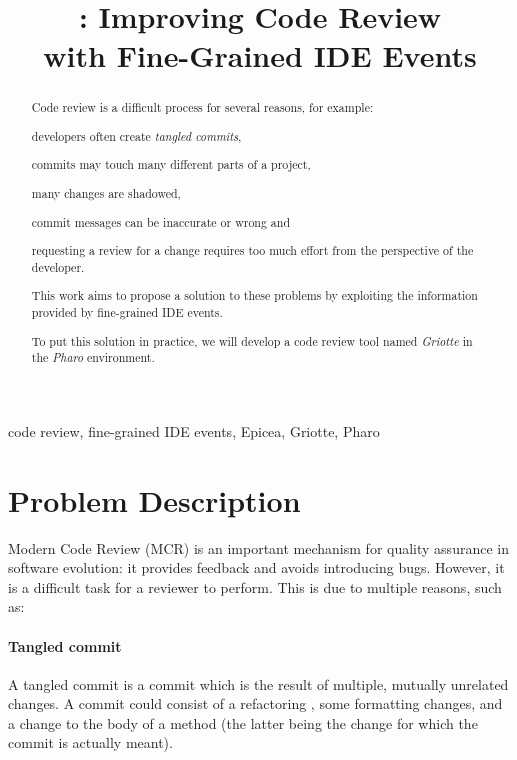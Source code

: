 \documentclass[conference,a4paper]{IEEEtran}
\title{\Gr{}: Improving Code Review\\with Fine-Grained IDE Events}
\author{\IEEEauthorblockN{Skip~Lentz}\IEEEauthorblockA{EEMCS\\Delft
    University of Technology} \and
  \IEEEauthorblockN{Mart\'{i}n~Dias}\IEEEauthorblockA{RMoD\\INRIA
    Lille-Nord Europe}}
\newcommand{\TC}{tangled commit}
\newcommand{\Ep}{Epicea}
\newcommand{\Gr}{Griotte}
\begin{document}
\maketitle{}
\begin{abstract}
  Code review is a difficult process for several reasons, for example:
  \begin{enumerate*}[label=(\arabic*)]
  \item developers often create \textit{tangled commits},
  \item commits may touch many different parts of a project,
  \item many changes are shadowed,
  \item commit messages can be inaccurate or wrong and
  \item requesting a review for a change requires too much effort from
    the perspective of the developer.
  \end{enumerate*}

  This work aims to propose a solution to these problems by exploiting
  the information provided by fine-grained IDE events.

  To put this solution in practice, we will develop a code review tool
  named \textit{\Gr} in the \textit{Pharo} environment.
\end{abstract}
\begin{IEEEkeywords}
  code review, fine-grained IDE events, \Ep, \Gr, Pharo
\end{IEEEkeywords}

\section{Problem Description}
\label{sec:problem-description}
Modern Code Review (MCR) is an important mechanism for quality
assurance in software evolution: it provides feedback and avoids
introducing bugs. However, it is a difficult task for a reviewer to
perform. This is due to multiple reasons, such as:

\paragraph{Tangled commit}

A \TC{} is a commit which is the result of multiple, mutually
unrelated changes. A commit could consist of a refactoring
\cite{Fowl99a}, some formatting changes, and a change to the body of a
method (the latter being the change for which the commit is actually
meant).
\end{document}

